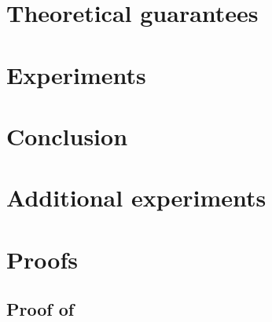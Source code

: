 \documentclass{article}
\begin{document}
\vspace{-15pt}
\section{Theoretical guarantees}
\label{sec:theory}
  

\vspace{-15pt}
\section{Experiments}
\label{sec:experiments}
  

\vspace{-15pt}
\section{Conclusion}
\label{sec:conclusion}
  

%  

\clearpage
\newpage

%  





\newpage
\appendix
\onecolumn

\section{Additional experiments}
\label{suppl:additional_experiements}
  

\newpage

\section{Proofs}
\label{suppl:examples}
  

\subsection{Proof of }
\label{suppl:marginal}
  
\end{document}
